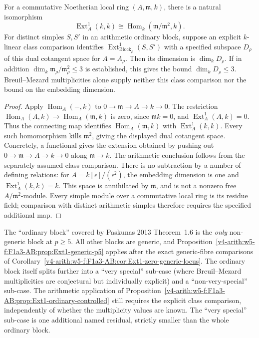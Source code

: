 \begin{proposition}
\label{v4-arith:w5-f:F1a3-AB:prop:Ext1-ordinary-controlled}
For a commutative Noetherian local ring \((A,\mathfrak m,k)\),
there is a natural isomorphism
\[
 \operatorname{Ext}^1_A(k,k)\cong
 \operatorname{Hom}_k(\mathfrak m/\mathfrak m^2,k).
\]
For distinct simples \(S,S'\) in an arithmetic ordinary block, suppose
an explicit \(k\)-linear class comparison identifies
\(\operatorname{Ext}^1_{\mathrm{Block}_\rho}(S,S')\) with a specified
subspace \(D_\rho\) of this dual cotangent space for \(A=A_\rho\).
Then its dimension is \(\dim_k D_\rho\). If in addition
\(\dim_k\mathfrak m_\rho/\mathfrak m_\rho^2\leq3\) is established,
this gives the bound \(\dim_k D_\rho\leq3\).
Breuil--Mezard multiplicities alone supply neither this class
comparison nor the bound on the embedding dimension.
\end{proposition}
\begin{proof}
Apply \(\operatorname{Hom}_A(-,k)\) to
\(0\to\mathfrak m\to A\to k\to0\).
The restriction \(\operatorname{Hom}_A(A,k)\to
\operatorname{Hom}_A(\mathfrak m,k)\) is zero, since
\(\mathfrak m k=0\), and \(\operatorname{Ext}^1_A(A,k)=0\).
Thus the connecting map identifies \(\operatorname{Hom}_A(\mathfrak m,k)\)
with \(\operatorname{Ext}^1_A(k,k)\). Every such homomorphism kills
\(\mathfrak m^2\), giving the displayed dual cotangent space.
Concretely, a functional gives the extension obtained by pushing out
\(0\to\mathfrak m\to A\to k\to0\) along \(\mathfrak m\to k\).
The arithmetic conclusion follows from the separately assumed class
comparison. There is no subtraction by a number of defining relations:
for \(A=k[\epsilon]/(\epsilon^2)\), the embedding dimension is one
and \(\operatorname{Ext}^1_A(k,k)=k\). This space is annihilated by
\(\mathfrak m\), and is not a nonzero free \(A/\mathfrak m^2\)-module.
Every simple module over a commutative local ring is its residue field;
comparison with distinct arithmetic simples therefore requires the
specified additional map.
\end{proof}

\begin{remark}
\label{v4-arith:w5-f:F1a3-AB:rem:ordinary-narrow}
The ``ordinary block'' covered by Paskunas 2013
Theorem~1.6 is the \emph{only} non-generic block at \(p\geq 5\). All
other blocks are generic, and
Proposition~\ref{v4-arith:w5-f:F1a3-AB:prop:Ext1-generic-p5} applies
after the exact generic-fibre comparisons of
Corollary~\ref{v4-arith:w5-f:F1a3-AB:cor:Ext1-zero-generic-locus}. The
ordinary block itself splits further into a ``very special'' sub-case
(where Breuil--Mezard multiplicities are conjectural but
individually explicit) and a ``non-very-special'' sub-case. The
arithmetic application of
Proposition~\ref{v4-arith:w5-f:F1a3-AB:prop:Ext1-ordinary-controlled}
still requires the explicit class comparison, independently of whether
the multiplicity values are known. The ``very special'' sub-case is one additional named residual, strictly
smaller than the whole ordinary block.
\end{remark}


